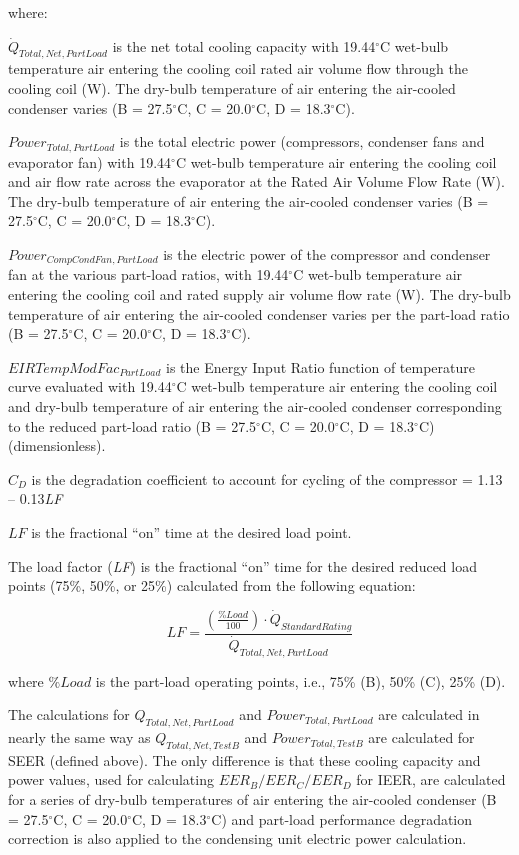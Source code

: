 where:

\({\dot Q_{Total,Net,PartLoad}}\) is the net total cooling capacity with 19.44\(^{\circ}\)C wet-bulb temperature air entering the cooling coil rated air volume flow through the cooling coil (W). The dry-bulb temperature of air entering the air-cooled condenser varies (B = 27.5\(^{\circ}\)C, C = 20.0\(^{\circ}\)C, D = 18.3\(^{\circ}\)C).

\(Powe{r_{Total,PartLoad}}\) is the total electric power (compressors, condenser fans and evaporator fan) with 19.44\(^{\circ}\)C wet-bulb temperature air entering the cooling coil and air flow rate across the evaporator at the Rated Air Volume Flow Rate (W). The dry-bulb temperature of air entering the air-cooled condenser varies (B = 27.5\(^{\circ}\)C, C = 20.0\(^{\circ}\)C, D = 18.3\(^{\circ}\)C).

\(Powe{r_{CompCondFan, PartLoad}}\) is the electric power of the compressor and condenser fan at the various part-load ratios, with 19.44\(^{\circ}\)C wet-bulb temperature air entering the cooling coil and rated supply air volume flow rate (W). The dry-bulb temperature of air entering the air-cooled condenser varies per the part-load ratio (B = 27.5\(^{\circ}\)C, C = 20.0\(^{\circ}\)C, D = 18.3\(^{\circ}\)C).

\(EIRTempModFa{c_{PartLoad}}\) is the Energy Input Ratio function of temperature curve evaluated with 19.44\(^{\circ}\)C wet-bulb temperature air entering the cooling coil and dry-bulb temperature of air entering the air-cooled condenser corresponding to the reduced part-load ratio (B = 27.5\(^{\circ}\)C, C = 20.0\(^{\circ}\)C, D = 18.3\(^{\circ}\)C) (dimensionless).

\({C_D}\) is the degradation coefficient to account for cycling of the compressor = 1.13 -- 0.13\emph{LF}

\(LF\) is the fractional ``on'' time at the desired load point.

The load factor (\emph{LF}) is the fractional ``on'' time for the desired reduced load points (75\%, 50\%, or 25\%) calculated from the following equation:

\begin{equation}
LF = \frac{{\left( {{\frac{{\% Load}}{{100}}}} \right) \cdot {{\dot Q}_{StandardRating}}}}{{{{\dot Q}_{Total,Net,PartLoad}}}}
\end{equation}

where \(\% Load\) is the part-load operating points, i.e., 75\% (B), 50\% (C), 25\% (D).

The calculations for \(Q_{Total,Net,PartLoad}\) and \(Power_{Total,PartLoad}\) are calculated in nearly the same way as \(Q_{Total,Net,TestB}\) and \(Power_{Total,TestB}\) are calculated for SEER (defined above). The only difference is that these cooling capacity and power values, used for calculating \(EER_{B} / EER_{C} / EER_{D}\) for IEER, are calculated for a series of dry-bulb temperatures of air entering the air-cooled condenser (B = 27.5\(^{\circ}\)C, C = 20.0\(^{\circ}\)C, D = 18.3\(^{\circ}\)C) and part-load performance degradation correction is also applied to the condensing unit electric power calculation.

